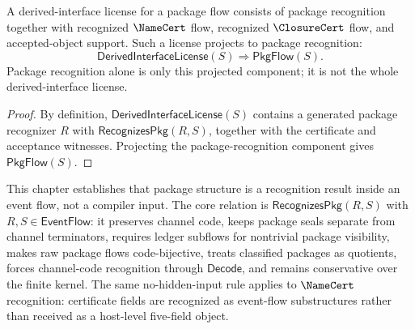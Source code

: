 \begin{corollary}
\label{cor:package-generated-weaker-than-derived-interface}
A derived-interface license for a package flow consists of package recognition together with recognized $\NameCert$ flow, recognized $\ClosureCert$ flow, and accepted-object support. Such a license projects to package recognition:
$$
  \mathsf{DerivedInterfaceLicense}(S)
  \Longrightarrow
  \mathsf{PkgFlow}(S).
$$
Package recognition alone is only this projected component; it is not the whole derived-interface license.
\end{corollary}

\begin{proof}
By definition, $\mathsf{DerivedInterfaceLicense}(S)$ contains a generated package recognizer $R$ with $\mathsf{RecognizesPkg}(R,S)$, together with the certificate and acceptance witnesses. Projecting the package-recognition component gives $\mathsf{PkgFlow}(S)$.
\end{proof}

\begin{remark}[Outlook]
\label{rem:package-generated-outlook}
This chapter establishes that package structure is a recognition result inside an event flow, not a compiler input. The core relation is $\mathsf{RecognizesPkg}(R,S)$ with $R,S \in \mathsf{EventFlow}$: it preserves channel code, keeps package seals separate from channel terminators, requires ledger subflows for nontrivial package visibility, makes raw package flows code-bijective, treats classified packages as quotients, forces channel-code recognition through $\mathsf{Decode}$, and remains conservative over the finite kernel. The same no-hidden-input rule applies to $\NameCert$ recognition: certificate fields are recognized as event-flow substructures rather than received as a host-level five-field object.
\end{remark}
